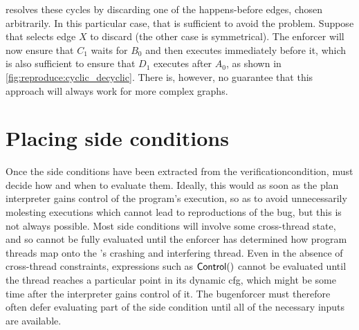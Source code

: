 {\Technique} resolves these cycles by discarding one of the
happens-before edges, chosen arbitrarily.  In this particular case,
that is sufficient to avoid the problem.  Suppose that {\technique}
selects edge $X$ to discard (the other case is symmetrical).  The
enforcer will now ensure that $C_1$ waits for $B_0$ and then executes
immediately before it, which is also sufficient to ensure that $D_1$
executes after $A_0$, as shown in
\autoref{fig:reproduce:cyclic_decyclic}.  There is, however, no
guarantee that this approach will always work for more complex graphs.

\section{Placing side conditions}
\label{sect:enforce:place_vcs}

Once the \glspl{side condition} have been extracted from the
\gls{verificationcondition}, {\technique} must decide how and when to
evaluate them.  Ideally, this would as soon as the \gls{plan
  interpreter} gains control of the program's execution, so as to
avoid unnecessarily molesting executions which cannot lead to
reproductions of the bug, but this is not always possible.  Most
\glspl{side condition} will involve some cross-thread state, and so
cannot be fully evaluated until the enforcer has determined how
program threads map onto the {\StateMachine}'s crashing and
interfering thread.  Even in the absence of cross-thread constraints,
expressions such as ${\mathsf{Control}}()$ cannot be evaluated until
the thread reaches a particular point in its \gls{dynamic cfg}, which
might be some time after the interpreter gains control of it.  The
\gls{bugenforcer} must therefore often defer evaluating part of the
\gls{side condition} until all of the necessary inputs are available.

